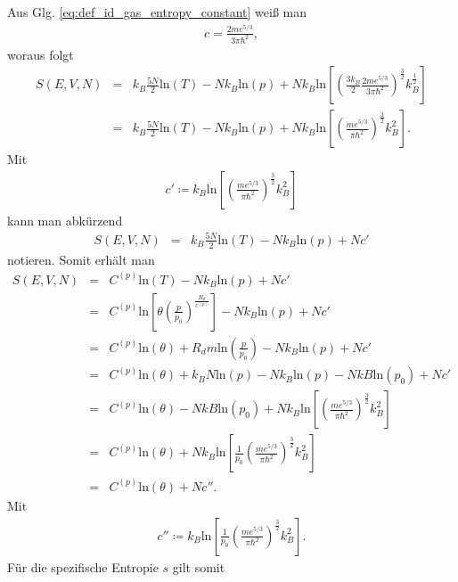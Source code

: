 \documentclass{book}
\renewcommand{\ln}{\text{ln}}
\begin{document}
%
Aus Glg. \eqref{eq:def_id_gas_entropy_constant} weiß man
%
\begin{eqnarray}
c = \frac{2me^{5/3}}{3\pi\hbar^2},
\end{eqnarray}
%
woraus folgt
%
\begin{eqnarray}
S\left(E, V, N\right) & = & k_B\frac{5N}{2}\ln\left(T\right) - Nk_B\ln\left(p\right) + Nk_B\ln\left[\left(\frac{3k_B}{2}\frac{2me^{5/3}}{3\pi\hbar^2}\right)^\frac{3}{2}k_B^{\frac{1}{2}}\right]\nonumber\\
& = & k_B\frac{5N}{2}\ln\left(T\right) - Nk_B\ln\left(p\right) + Nk_B\ln\left[\left(\frac{me^{5/3}}{\pi\hbar^2}\right)^\frac{3}{2}k_B^2\right].
\end{eqnarray}
%
Mit
%
\begin{eqnarray}
c' \coloneqq k_B\ln\left[\left(\frac{me^{5/3}}{\pi\hbar^2}\right)^\frac{3}{2}k_B^2\right]
\end{eqnarray}
%
kann man abkürzend
%
\begin{eqnarray}
S\left(E, V, N\right) & = & k_B\frac{5N}{2}\ln\left(T\right) - Nk_B\ln\left(p\right) + Nc'
\end{eqnarray}
%
notieren. Somit erhält man
%
\begin{eqnarray}
S\left(E, V, N\right) & = & C^{(p)}\ln\left(T\right) - Nk_B\ln\left(p\right) + Nc'\nonumber\\
 & = & C^{(p)}\ln\left[\theta\left(\frac{p}{p_0}\right)^{\frac{R_d}{c^{(p)}}}\right] - Nk_B\ln\left(p\right) + Nc'\nonumber\\
 & = & C^{(p)}\ln\left(\theta\right) + R_dm\ln\left(\frac{p}{p_0}\right) - Nk_B\ln\left(p\right) + Nc'\nonumber\\
 & = & C^{(p)}\ln\left(\theta\right) + k_BN\ln\left(p\right) - Nk_B\ln\left(p\right) - NkB\ln\left(p_0\right) + Nc'\nonumber\\
 & = & C^{(p)}\ln\left(\theta\right) - NkB\ln\left(p_0\right) + Nk_B\ln\left[\left(\frac{me^{5/3}}{\pi\hbar^2}\right)^\frac{3}{2}k_B^2\right]\nonumber\\
 & = & C^{(p)}\ln\left(\theta\right) + Nk_B\ln\left[\frac{1}{p_0}\left(\frac{me^{5/3}}{\pi\hbar^2}\right)^\frac{3}{2}k_B^2\right]\nonumber\\
 & = & C^{(p)}\ln\left(\theta\right) + Nc''.
\end{eqnarray}
%
Mit
%
\begin{eqnarray}
c'' \coloneqq k_B\ln\left[\frac{1}{p_0}\left(\frac{me^{5/3}}{\pi\hbar^2}\right)^\frac{3}{2}k_B^2\right].
\end{eqnarray}
%
Für die spezifische Entropie $s$ gilt somit
\end{document}
